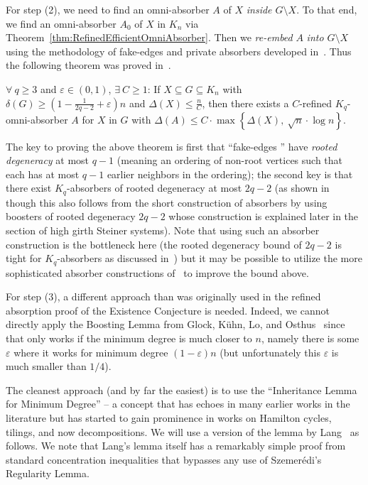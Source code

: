 \documentclass[twoside,leqno]{article}
\begin{document}
For step (2), we need to find an omni-absorber $A$ of $X$ \emph{inside $G\setminus X$}. To that end, we find an omni-absorber $A_0$ of $X$ in $K_n$ via Theorem~\ref{thm:RefinedEfficientOmniAbsorber}. Then we \emph{re-embed} $A$ \emph{into $G\setminus X$} using the methodology of fake-edges and private absorbers developed in~\cite{DPI}. Thus the following theorem was proved in~\cite{DHLP25}. 

\begin{thm}\label{thm:NWRefinedEfficientOmniAbsorber}
$\forall~q\ge 3$ and $\varepsilon\in (0,1)$, $\exists~C\ge 1$:
If $X\subseteq  G\subseteq K_n$ with $\delta(G)\ge (1-\frac{1}{2q-2} + \varepsilon)n$ and $\Delta(X) \le \frac{n}{C}$, then there exists a $C$-refined $K_q$-omni-absorber $A$ for $X$ in $G$ with $\Delta(A) \le C\cdot \max\left\{\Delta(X),~\sqrt{n}\cdot \log n\right\}$.    
\end{thm}

The key to proving the above theorem is first that ``fake-edges '' have \emph{rooted degeneracy} at most $q-1$ (meaning an ordering of non-root vertices such that each has at most $q-1$ earlier neighbors in the ordering); the second key is that there exist $K_q$-absorbers of rooted degeneracy at most $2q-2$ (as shown in~\cite{DKPIII} though this also follows from the short construction of absorbers by using boosters of rooted degeneracy $2q-2$ whose construction is explained later in the section of high girth Steiner systems). Note that using such an absorber construction is the bottleneck here (the rooted degeneracy bound of $2q-2$ is tight for $K_q$-absorbers as discussed in~\cite{DKPIII}) but it may be possible to utilize the more sophisticated absorber constructions of~\cite{GKLMO19} to improve the bound above. 

For step (3), a different approach than was originally used in the refined absorption proof of the Existence Conjecture is needed. Indeed, we cannot directly apply the Boosting Lemma from Glock, K\"uhn, Lo, and Osthus~\cite{GKLO16} since that only works if the minimum degree is much closer to $n$, namely there is some $\varepsilon$ where it works for minimum degree $(1-\varepsilon)n$ (but unfortunately this $\varepsilon$ is much smaller than $1/4$). 

The cleanest approach (and by far the easiest) is to use the ``Inheritance Lemma for Minimum Degree'' -- a concept that has echoes in many earlier works in the literature but has started to gain prominence in works on Hamilton cycles, tilings, and now decompositions. We will use a version of the lemma by Lang~\cite{lang2023tiling} as follows. We note that Lang's lemma itself has a remarkably simple proof from standard concentration inequalities that bypasses any use of Szemer\'edi's Regularity Lemma.
\end{document}
